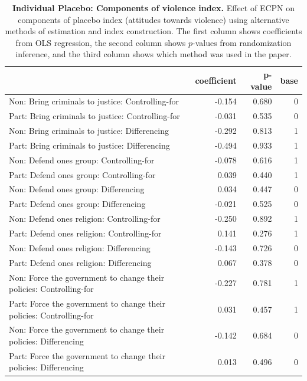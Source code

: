 \documentclass[
]{article}
\begin{document}
\begin{table}[H]
\begin{center}
\label{tab:pl_vio_ind1}
\caption{\textbf{Individual Placebo: Components of violence index.} Effect of ECPN on components of placebo index (attitudes towards violence) using alternative methods of estimation and index construction. The first column shows coefficients from OLS regression, the second column shows $p$-values from randomization inference, and the third column shows which method was used in the paper.}
\smallskip

\begin{tabular}{l|r|r|r}
\hline
  & coefficient & p-value & base\\
\hline
Non: Bring criminals to justice: Controlling-for & -0.154 & 0.680 & 0\\
\hline
Part: Bring criminals to justice: Controlling-for & -0.031 & 0.535 & 0\\
\hline
Non: Bring criminals to justice: Differencing & -0.292 & 0.813 & 1\\
\hline
Part: Bring criminals to justice: Differencing & -0.494 & 0.933 & 1\\
\hline
Non: Defend ones group: Controlling-for & -0.078 & 0.616 & 1\\
\hline
Part: Defend ones group: Controlling-for & 0.039 & 0.440 & 1\\
\hline
Non: Defend ones group: Differencing & 0.034 & 0.447 & 0\\
\hline
Part: Defend ones group: Differencing & -0.021 & 0.525 & 0\\
\hline
Non: Defend ones religion: Controlling-for & -0.250 & 0.892 & 1\\
\hline
Part: Defend ones religion: Controlling-for & 0.141 & 0.276 & 1\\
\hline
Non: Defend ones religion: Differencing & -0.143 & 0.726 & 0\\
\hline
Part: Defend ones religion: Differencing & 0.067 & 0.378 & 0\\
\hline
Non: Force the government to change their policies: Controlling-for & -0.227 & 0.781 & 1\\
\hline
Part: Force the government to change their policies: Controlling-for & 0.031 & 0.457 & 1\\
\hline
Non: Force the government to change their policies: Differencing & -0.142 & 0.684 & 0\\
\hline
Part: Force the government to change their policies: Differencing & 0.013 & 0.496 & 0\\

\end{tabular}
\end{center}
\end{table}
\end{document}
